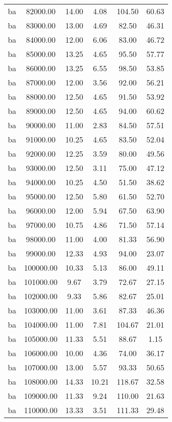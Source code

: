 \begin{table}[ht]
\begin{table}[ht]
\begin{tabular}{|cccccc}
  ba & 82000.00 & 14.00 & 4.08 & 104.50 & 60.63 \\ 
  ba & 83000.00 & 13.00 & 4.69 & 82.50 & 46.31 \\ 
  ba & 84000.00 & 12.00 & 6.06 & 83.00 & 46.72 \\ 
  ba & 85000.00 & 13.25 & 4.65 & 95.50 & 57.77 \\ 
  ba & 86000.00 & 13.25 & 6.55 & 98.50 & 53.85 \\ 
  ba & 87000.00 & 12.00 & 3.56 & 92.00 & 56.21 \\ 
  ba & 88000.00 & 12.50 & 4.65 & 91.50 & 53.92 \\ 
  ba & 89000.00 & 12.50 & 4.65 & 94.00 & 60.62 \\ 
  ba & 90000.00 & 11.00 & 2.83 & 84.50 & 57.51 \\ 
  ba & 91000.00 & 10.25 & 4.65 & 83.50 & 52.04 \\ 
  ba & 92000.00 & 12.25 & 3.59 & 80.00 & 49.56 \\ 
  ba & 93000.00 & 12.50 & 3.11 & 75.00 & 47.12 \\ 
  ba & 94000.00 & 10.25 & 4.50 & 51.50 & 38.62 \\ 
  ba & 95000.00 & 12.50 & 5.80 & 61.50 & 52.70 \\ 
  ba & 96000.00 & 12.00 & 5.94 & 67.50 & 63.90 \\ 
  ba & 97000.00 & 10.75 & 4.86 & 71.50 & 57.14 \\ 
  ba & 98000.00 & 11.00 & 4.00 & 81.33 & 56.90 \\ 
  ba & 99000.00 & 12.33 & 4.93 & 94.00 & 23.07 \\ 
  ba & 100000.00 & 10.33 & 5.13 & 86.00 & 49.11 \\ 
  ba & 101000.00 & 9.67 & 3.79 & 72.67 & 27.15 \\ 
  ba & 102000.00 & 9.33 & 5.86 & 82.67 & 25.01 \\ 
  ba & 103000.00 & 11.00 & 3.61 & 87.33 & 46.36 \\ 
  ba & 104000.00 & 11.00 & 7.81 & 104.67 & 21.01 \\ 
  ba & 105000.00 & 11.33 & 5.51 & 88.67 & 1.15 \\ 
  ba & 106000.00 & 10.00 & 4.36 & 74.00 & 36.17 \\ 
  ba & 107000.00 & 13.00 & 5.57 & 93.33 & 50.65 \\ 
  ba & 108000.00 & 14.33 & 10.21 & 118.67 & 32.58 \\ 
  ba & 109000.00 & 11.33 & 9.24 & 110.00 & 21.63 \\ 
  ba & 110000.00 & 13.33 & 3.51 & 111.33 & 29.48 \\ 

\end{tabular}
\end{table}
\end{table}
